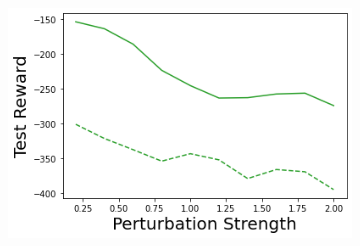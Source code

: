 \begin{figure}
\begin{subfigure}{.24\textwidth}
    \end{subfigure}
    \begin{subfigure}{.24\textwidth}
        \includegraphics[width=\textwidth]{sections/011_icml2022/resources/state_shift-PostNet-AcrobotShift-v0-mean_reward_.png}
    \end{subfigure}
    

\end{figure}
